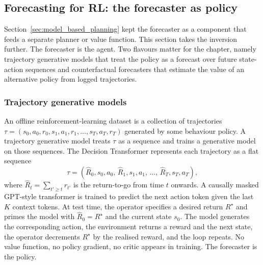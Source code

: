 \subsection{Forecasting for RL: the forecaster as policy}
\label{sec:forecaster_as_policy}
\label{sec:forecasting_in_rl}

Section~\ref{sec:model_based_planning} kept the forecaster as a component
that feeds a separate planner or value function. This section takes the
inversion further. The forecaster is the agent. Two flavours matter for
the chapter, namely trajectory generative models that treat the policy as
a forecast over future state-action sequences and counterfactual
forecasters that estimate the value of an alternative policy from logged
trajectories.

\subsubsection{Trajectory generative models}
\label{sec:trajectory_gen}

An offline reinforcement-learning dataset is a collection of trajectories
$\tau = (s_0, a_0, r_0, s_1, a_1, r_1, \dots, s_T, a_T, r_T)$ generated by
some behaviour policy. A trajectory generative model treats $\tau$ as a
sequence and trains a generative model on those sequences. The
\citet{Chen2021DT} Decision Transformer represents each trajectory as a
flat sequence
\begin{equation}
\tau = (\widehat R_0, s_0, a_0,\, \widehat R_1, s_1, a_1,\, \dots,\,
  \widehat R_T, s_T, a_T),
\label{eq:dt_sequence}
\end{equation}
where $\widehat R_t = \sum_{t' \ge t} r_{t'}$ is the return-to-go from
time $t$ onwards. A causally masked GPT-style transformer is trained to
predict the next action token given the last $K$ context tokens. At test
time, the operator specifies a desired return $R^\star$ and primes the
model with $\widehat R_0 = R^\star$ and the current state $s_0$. The model
generates the corresponding action, the environment returns a reward and
the next state, the operator decrements $R^\star$ by the realised reward,
and the loop repeats. No value function, no policy gradient, no critic
appears in training. The forecaster is the policy.

